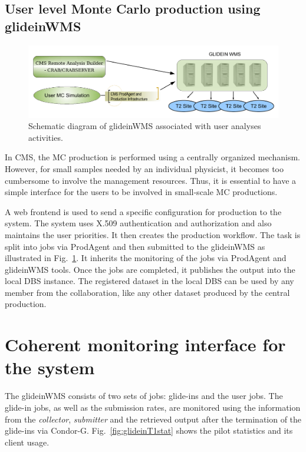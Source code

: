 \documentclass[a4paper]{jpconf}
\begin{document}
\subsection{User level Monte Carlo production using glideinWMS}
\begin{figure}
\begin{center}
\includegraphics[scale=0.4]{user_analysis}
\end{center}
\caption{Schematic diagram of glideinWMS associated with user analyses activities.}
\label{fig:user_analysis}
\end{figure}
In CMS, the MC production is performed using a centrally organized mechanism. However,
for small samples needed by an individual physicist, it becomes too cumbersome
to involve the management resources. Thus, it is essential to have a simple interface
for the users to be involved in small-scale MC productions. 

A web frontend is used to send a specific configuration for production to the system. 
The system uses X.509 authentication and authorization and also maintains the user priorities. 
It then creates the production workflow. The task is split into jobs via ProdAgent and then 
submitted to the glideinWMS as illustrated in Fig.~\ref{fig:user_analysis}. It inherits the monitoring of the 
jobs via ProdAgent and glideinWMS tools. 
Once the jobs are completed, it publishes the output into the local DBS instance. The registered 
dataset in the local DBS can be used by any member from the collaboration, like any other dataset produced 
by the central production. 

\section{Coherent monitoring interface for the system}
The glideinWMS consists of two sets of jobs: glide-ins and the user jobs. The
glide-in jobs, as well as the submission rates, are monitored using the information from the \emph{collector},
\emph{submitter} and the retrieved output after the termination of the glide-ins via Condor-G.
Fig.~\ref{fig:glideinT1stat} shows the pilot statistics and its client usage.
\end{document}
